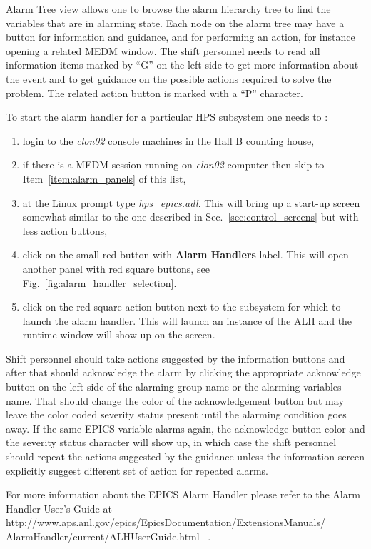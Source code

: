 \documentclass[letter,10pt]{article}
\begin{document}
Alarm Tree view allows one to browse the alarm hierarchy tree to find the variables 
that are in alarming state. Each node on the alarm tree may have a button for information and guidance, and for performing an action, for instance 
opening a related MEDM window. 
The shift personnel needs to read all information items marked by ``G'' on the left side to get more information about the event and to get 
guidance on the possible actions required to solve the problem. The related action button is marked with a ``P'' character. 

To start the alarm handler for a particular HPS subsystem one needs to :
\begin{enumerate}
 \item login to the \textit{clon02} console machines in the Hall B counting house,
 \item if there is a MEDM session running on \textit{clon02} computer then skip to Item~\ref{item:alarm_panels} of this list,
 \item at the Linux prompt type \textit{hps\_epics.adl}. This will bring up a start-up screen somewhat 
       similar to the one described in Sec.~\ref{sec:control_screens} but with less action buttons, 
 \item \label{item:alarm_panels} click on the small red button with \textbf{Alarm Handlers} label. This will open another panel 
       with red square buttons, see Fig.~\ref{fig:alarm_handler_selection}.
 \item click on the red square action button next to the subsystem for which to launch the alarm handler. This will 
       launch an instance of the ALH and the runtime window will show up on the screen.
\end{enumerate}

Shift personnel should take actions suggested by the information buttons and after that should acknowledge the alarm by clicking the 
appropriate acknowledge button on the left side of the alarming group name or the alarming variables name. That should change  
the color of the acknowledgement button but may leave the color coded severity status present until the alarming condition goes away. 
If the same EPICS variable alarms again, the acknowledge button color and the severity status character will show up, in which case 
the shift personnel should repeat the actions suggested by the guidance unless the information screen explicitly suggest different set of 
action for repeated alarms.

For more information about the EPICS Alarm Handler please refer to the Alarm Handler User's Guide  at \newline 
http://www.aps.anl.gov/epics/EpicsDocumentation/ExtensionsManuals/ \newline AlarmHandler/current/ALHUserGuide.html ~.
\end{document}

